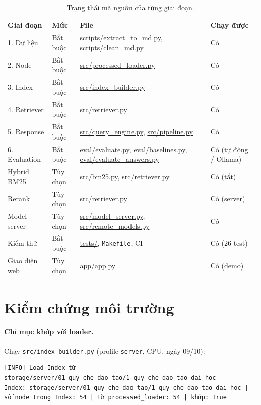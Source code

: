 \begin{table}[htbp]
  \centering
  \footnotesize
  \setlength{\tabcolsep}{4pt}
  \renewcommand{\arraystretch}{1.15}
  \begin{tabularx}{\textwidth}{l l X l}
    \toprule
    \textbf{Giai đoạn} & \textbf{Mức} & \textbf{File} & \textbf{Chạy được} \\
    \midrule
    1. Dữ liệu & Bắt buộc & \url{scripts/extract_to_md.py}, \url{scripts/clean_md.py} & Có \\
    2. Node & Bắt buộc & \url{src/processed_loader.py} & Có \\
    3. Index & Bắt buộc & \url{src/index_builder.py} & Có \\
    4. Retriever & Bắt buộc & \url{src/retriever.py} & Có \\
    5. Response & Bắt buộc & \url{src/query_engine.py}, \url{src/pipeline.py} & Có \\
    6. Evaluation & Bắt buộc & \url{eval/evaluate.py}, \url{eval/baselines.py}, \url{eval/evaluate_answers.py} & Có (tự động / Ollama) \\
    Hybrid BM25 & Tùy chọn & \url{src/bm25.py}, \url{src/retriever.py} & Có (tắt) \\
    Rerank & Tùy chọn & \url{src/retriever.py} & Có (server) \\
    Model server & Tùy chọn & \url{src/model_server.py}, \url{src/remote_models.py} & Có \\
    Kiểm thử & Bắt buộc & \url{tests/}, \texttt{Makefile}, CI & Có (26 test) \\
    Giao diện web & Tùy chọn & \url{app/app.py} & Có (demo) \\
    \bottomrule
  \end{tabularx}
  \caption{Trạng thái mã nguồn của từng giai đoạn.}
  \label{tab:trang-thai-nguon}
\end{table}

\section{Kiểm chứng môi trường}
\label{sec:kiem-chung-moi-truong}

\paragraph{Chỉ mục khớp với loader.} Chạy \texttt{src/index\_builder.py} (profile \texttt{server}, CPU,
ngày 09/10):

\begin{lstlisting}[caption={Kiểm chứng số Node trong chỉ mục.}, label={lst:kiem-chung-index}]
[INFO] Load Index từ storage/server/01_quy_che_dao_tao/1_quy_che_dao_tao_dai_hoc
Index: storage/server/01_quy_che_dao_tao/1_quy_che_dao_tao_dai_hoc | số node trong Index: 54 | từ processed_loader: 54 | khớp: True
\end{lstlisting}


